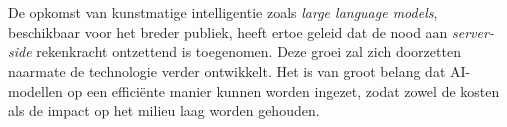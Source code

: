 
%
%
%
%
%

%



\chapter*{}

De opkomst van kunstmatige intelligentie zoals \textit{large language models}, beschikbaar voor het breder publiek, heeft ertoe geleid dat de nood aan \textit{server-side} rekenkracht ontzettend is toegenomen. Deze groei zal zich doorzetten naarmate de technologie verder ontwikkelt. Het is van groot belang dat AI-modellen op een efficiënte manier kunnen worden ingezet, zodat zowel de kosten als de impact op het milieu laag worden gehouden. 

